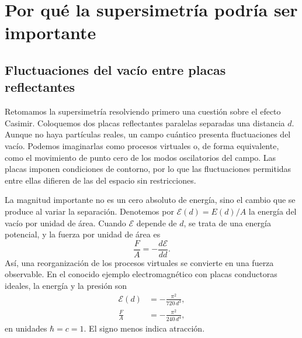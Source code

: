 \chapter{Por qué la supersimetría podría ser importante}


\section{Fluctuaciones del vacío entre placas reflectantes}

Retomamos la supersimetría resolviendo primero una cuestión sobre el efecto Casimir. Coloquemos dos placas reflectantes paralelas separadas una distancia \(d\). Aunque no haya partículas reales, un campo cuántico presenta fluctuaciones del vacío. Podemos imaginarlas como procesos virtuales o, de forma equivalente, como el movimiento de punto cero de los modos oscilatorios del campo. Las placas imponen condiciones de contorno, por lo que las fluctuaciones permitidas entre ellas difieren de las del espacio sin restricciones.

La magnitud importante no es un cero absoluto de energía, sino el cambio que se produce al variar la separación. Denotemos por \(\mathcal E(d)=E(d)/A\) la energía del vacío por unidad de área. Cuando \(\mathcal E\) depende de \(d\), se trata de una energía potencial, y la fuerza por unidad de área es
\begin{equation}
\frac{F}{A}=-\frac{d\mathcal E}{dd}.
\end{equation}
Así, una reorganización de los procesos virtuales se convierte en una fuerza observable. En el conocido ejemplo electromagnético con placas conductoras ideales, la energía y la presión son
\begin{align}
\mathcal E(d)&=-\frac{\pi^2}{720\,d^3},\\
\frac{F}{A}&=-\frac{\pi^2}{240\,d^4},
\end{align}
en unidades \(\hbar=c=1\). El signo menos indica atracción.

